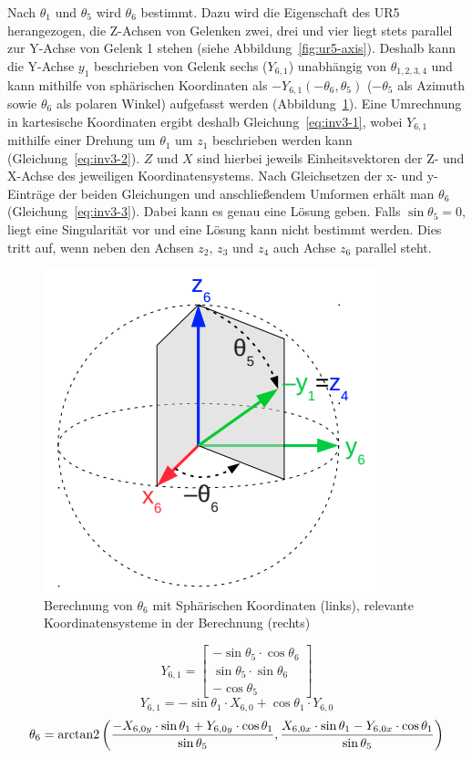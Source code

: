 Nach $\theta_1$ und $\theta_5$ wird $\theta_6$ bestimmt.
Dazu wird die Eigenschaft des UR5 herangezogen, die Z-Achsen von Gelenken zwei, drei und vier liegt stets parallel zur Y-Achse von Gelenk 1 stehen (siehe Abbildung~\ref{fig:ur5-axis}).
Deshalb kann die Y-Achse $y_1$ beschrieben von Gelenk sechs ($Y_{6,1}$) unabhängig von $\theta_{1,2,3,4}$ und kann mithilfe von sphärischen Koordinaten als $-Y_{6,1}(-\theta_6,\theta_5)$ ($-\theta_5$ als Azimuth sowie $\theta_6$ als polaren Winkel) aufgefasst werden (Abbildung~\ref{fig:inv1-3}).
Eine Umrechnung in kartesische Koordinaten ergibt deshalb Gleichung~\ref{eq:inv3-1}, wobei $Y_{6,1}$ mithilfe einer Drehung um $\theta_1$ um $z_1$ beschrieben werden kann (Gleichung~\ref{eq:inv3-2}).
$Z$ und $X$ sind hierbei jeweils Einheitsvektoren der Z- und X-Achse des jeweiligen Koordinatensystems.
Nach Gleichsetzen der x- und y-Einträge der beiden Gleichungen und anschließendem Umformen erhält man $\theta_6$ (Gleichung~\ref{eq:inv3-3}).
Dabei kann es genau eine Lösung geben.
Falls $\sin\theta_5=0$, liegt eine Singularität vor und eine Lösung kann nicht bestimmt werden.
Dies tritt auf, wenn neben den Achsen $z_2$, $z_3$ und $z_4$ auch Achse $z_6$ parallel steht.
\begin{figure}[h]
    \centering
    \includegraphics[width = .4\textwidth]{Bilder/inv3}
    \caption{Berechnung von $\theta_6$ mit Sphärischen Koordinaten (links), relevante Koordinatensysteme in der Berechnung (rechts)}\label{fig:inv1-3}
\end{figure}
\begin{equation}
    Y_{6,1}=
    \begin{bmatrix}
        -\sin\theta_5 \cdot \cos\theta_6 \\ \sin\theta_5 \cdot\sin\theta_6 \\ -\cos\theta_5
    \end{bmatrix}
    \label{eq:inv3-1}
\end{equation}
\begin{equation}
    Y_{6,1}=
    -\sin\theta_1\cdot X_{6,0} + \cos\theta_1\cdot Y_{6,0}
    \label{eq:inv3-2}
\end{equation}
\begin{equation}
    \theta_6=
    \operatorname{arctan2}\left(
    \frac{
        -X_{6,0y} \cdot \sin\theta_1 + Y_{6,0y} \cdot \cos\theta_1
    }{
        \sin\theta_5
    },
    \frac{
        X_{6,0x} \cdot \sin\theta_1 - Y_{6,0x} \cdot \cos\theta_1
    }{
        \sin\theta_5
    }\right)
    \label{eq:inv3-3}
\end{equation}

